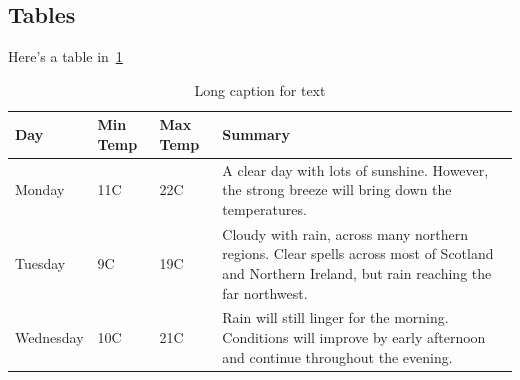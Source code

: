 \subsection{Tables}\label{ssec:tables}

Here's a table in~\cref{tab:table}

\begin{table}
    \centering
    \begin{tabular}{ | l | l | l | p{5cm} |}
    \hline
    Day & Min Temp & Max Temp & Summary \\ 
    \hline
    Monday & 11C & 22C & A clear day with lots of sunshine.  
    However, the strong breeze will bring down the temperatures. \\ 
    \hline
    Tuesday & 9C & 19C & Cloudy with rain, across many northern regions. Clear spells
    across most of Scotland and Northern Ireland, 
    but rain reaching the far northwest. \hfill \\ 
    \hline
    Wednesday & 10C & 21C & Rain will still linger for the morning. \hfill 
    Conditions will improve by early afternoon and continue 
    throughout the evening.\\
    \hline
    \end{tabular}
    \caption[Short caption for table]{Long caption for text \label{tab:table}}
\end{table}

